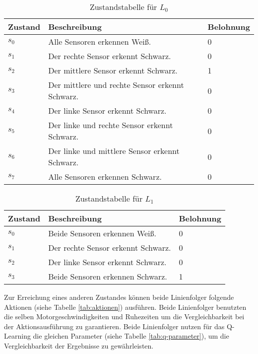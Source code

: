 \begin{table}[H]
  \caption{Zustandstabelle für $L_0$}
  \label{tab:zustaende_drei_sensoren}
  \renewcommand{\arraystretch}{1.2}
  \centering
  \sffamily
  \begin{footnotesize}
    \begin{tabular}{l l l}
    \toprule
    \textbf{Zustand} & \textbf{Beschreibung} & \textbf{Belohnung}\\
    \midrule
    $s_0$	&	Alle Sensoren erkennen Weiß.	&	0\\ %
    $s_1$	&	Der rechte Sensor erkennt Schwarz.	&	0\\ %
    $s_2$	&	Der mittlere Sensor erkennt Schwarz.	&	1\\ %
    $s_3$	&	Der mittlere und rechte Sensor erkennt Schwarz.	&	0\\ %
    $s_4$	&	Der linke Sensor erkennt Schwarz.	&	0\\ %
    $s_5$	&	Der linke und rechte Sensor erkennt Schwarz.	&	0\\ %
    $s_6$	&	Der linke und mittlere Sensor erkennt Schwarz.	&	0\\ %
    $s_7$	&	Alle Sensoren erkennen Schwarz.	&	0\\ %
    \bottomrule
    \end{tabular}
  \end{footnotesize}
  \rmfamily
\end{table}

\begin{table}[!htbp]
  \caption{Zustandstabelle für $L_1$}
  \label{tab:zustaende_zwei_sensoren}
  \renewcommand{\arraystretch}{1.2}
  \centering
  \sffamily
  \begin{footnotesize}
    \begin{tabular}{l l l}
    \toprule
    \textbf{Zustand} & \textbf{Beschreibung} & \textbf{Belohnung}\\
    \midrule
    $s_0$	&	Beide Sensoren erkennen Weiß.	&	0\\
    $s_1$	&	Der rechte Sensor erkennt Schwarz.	&	0\\
    $s_2$	&	Der linke Sensor erkennt Schwarz.	&	0\\
    $s_3$	&	Beide Sensoren erkennen Schwarz.	&	1\\
    \bottomrule
    \end{tabular}
  \end{footnotesize}
  \rmfamily
\end{table}

Zur Erreichung eines anderen Zustandes können beide Linienfolger folgende Aktionen (siehe Tabelle \ref{tab:aktionen}) ausführen. Beide Linienfolger benutzten die selben Motorgeschwindigkeiten und Ruhezeiten um die Vergleichbarkeit bei der Aktionsausführung zu garantieren. Beide Linienfolger nutzen für das Q-Learning die gleichen Parameter (siehe Tabelle \ref{tab:q-parameter}), um die Vergleichbarkeit der Ergebnisse zu gewährleisten.

